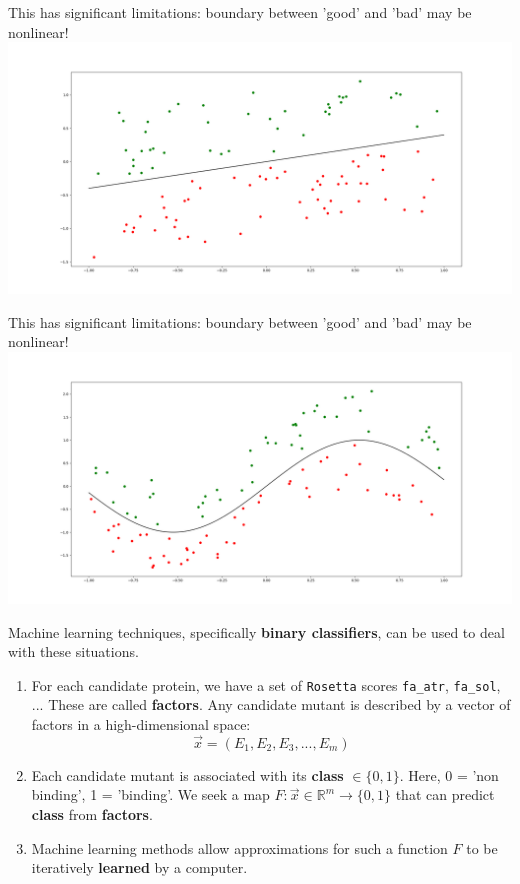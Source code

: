 \documentclass{beamer}
\begin{document}
\begin{frame}
    This has significant limitations: boundary between 'good' and 'bad' may be nonlinear! \\
    \includegraphics[width=\linewidth]{diagram1.png}
\end{frame}
\begin{frame}
    This has significant limitations: boundary between 'good' and 'bad' may be nonlinear! \\
    \includegraphics[width=\linewidth]{diagram2.png}
\end{frame}

\begin{frame}
    Machine learning techniques, specifically \textbf{binary classifiers}, can be used to deal with these situations.
\begin{enumerate}
\item For each candidate protein, we have a set of \texttt{Rosetta} scores \texttt{fa\_atr}, \texttt{fa\_sol}, ...
    These are called \textbf{factors}. Any candidate mutant is described by a vector of factors in a high-dimensional space:
    $$\vec{x} = (E_1, E_2, E_3, ..., E_m)$$
    
    \item Each candidate mutant is associated with its \textbf{class} $\in \{0, 1\}$. Here, 0 = 'non binding', 1 = 'binding'. We seek a map $F : \vec{x} \in \mathbb{R}^m \to \{0, 1\}$ that can predict \textbf{class} from \textbf{factors}.
    
    \item Machine learning methods allow approximations for such a function $F$ to be iteratively \textbf{learned} by a computer.
\end{enumerate}
\end{frame}
\end{document}
